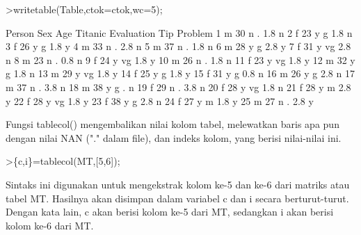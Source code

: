 \documentclass[a4paper,10pt]{article}
\begin{document}
\begin{eulernotebook}
\begin{eulercomment}
\begin{eulercomment}
\begin{eulercomment}
\begin{eulercomment}
\begin{eulercomment}
\begin{eulercomment}
\begin{eulercomment}
\begin{eulercomment}
\begin{eulercomment}
\begin{eulercomment}
\begin{eulercomment}
\begin{eulercomment}
\begin{eulercomment}
\begin{eulercomment}
\begin{eulercomment}
\begin{eulercomment}
\begin{eulercomment}
\end{eulercomment}
\begin{eulerprompt}
>writetable(Table,ctok=ctok,wc=5);
\end{eulerprompt}
\begin{euleroutput}
   Person  Sex  Age Titanic Evaluation  Tip Problem
        1    m   30       n          .  1.8       n
        2    f   23       y          g  1.8       n
        3    f   26       y          g  1.8       y
        4    m   33       n          .  2.8       n
        5    m   37       n          .  1.8       n
        6    m   28       y          g  2.8       y
        7    f   31       y         vg  2.8       n
        8    m   23       n          .  0.8       n
        9    f   24       y         vg  1.8       y
       10    m   26       n          .  1.8       n
       11    f   23       y         vg  1.8       y
       12    m   32       y          g  1.8       n
       13    m   29       y         vg  1.8       y
       14    f   25       y          g  1.8       y
       15    f   31       y          g  0.8       n
       16    m   26       y          g  2.8       n
       17    m   37       n          .  3.8       n
       18    m   38       y          g    .       n
       19    f   29       n          .  3.8       n
       20    f   28       y         vg  1.8       n
       21    f   28       y          m  2.8       y
       22    f   28       y         vg  1.8       y
       23    f   38       y          g  2.8       n
       24    f   27       y          m  1.8       y
       25    m   27       n          .  2.8       y
\end{euleroutput}
\begin{eulercomment}
Fungsi tablecol() mengembalikan nilai kolom tabel, melewatkan baris
apa pun dengan nilai NAN ("." dalam file), dan indeks kolom, yang
berisi nilai-nilai ini.
\end{eulercomment}
\begin{eulerprompt}
>\{c,i\}=tablecol(MT,[5,6]);
\end{eulerprompt}
\begin{eulercomment}
Sintaks ini digunakan untuk mengekstrak kolom ke-5 dan ke-6 dari
matriks atau tabel MT. Hasilnya akan disimpan dalam variabel c dan i
secara berturut-turut. Dengan kata lain, c akan berisi kolom ke-5 dari
MT, sedangkan i akan berisi kolom ke-6 dari MT.


\end{eulercomment}
\end{eulercomment}
\end{eulercomment}
\end{eulercomment}
\end{eulercomment}
\end{eulercomment}
\end{eulercomment}
\end{eulercomment}
\end{eulercomment}
\end{eulercomment}
\end{eulercomment}
\end{eulercomment}
\end{eulercomment}
\end{eulercomment}
\end{eulercomment}
\end{eulercomment}
\end{eulercomment}
\end{eulernotebook}
\end{document}
